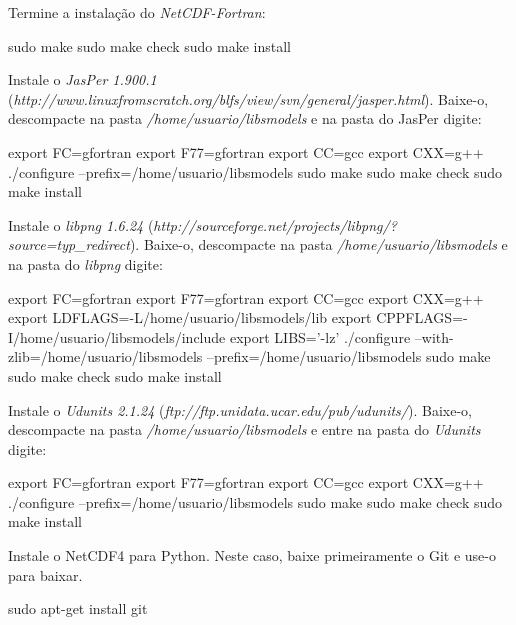 \noindent Termine a instalação do \textit{NetCDF-Fortran}:
\bigskip

\begin{bashcode}
sudo make
sudo make check
sudo make install
\end{bashcode}
\bigskip

\noindent Instale o \textit{JasPer 1.900.1} (\textcolor{bleu_cite}{\textit{http://www.linuxfromscratch.org/blfs/view/svn/general/jasper.html}}). Baixe-o, descompacte na pasta \textit{/home/usuario/libsmodels} e na pasta do JasPer digite:
\bigskip

\begin{bashcode}
export FC=gfortran
export F77=gfortran
export CC=gcc
export CXX=g++
./configure --prefix=/home/usuario/libsmodels
sudo make
sudo make check
sudo make install
\end{bashcode}
\bigskip

\noindent Instale o \textit{libpng 1.6.24} (\textcolor{bleu_cite}{\textit{http://sourceforge.net/projects/libpng/?source=typ\_redirect}}). Baixe-o, descompacte na pasta \textit{/home/usuario/libsmodels} e na pasta do \textit{libpng} digite:
\bigskip

\begin{bashcode}[fontsize=\scriptsize]
export FC=gfortran
export F77=gfortran
export CC=gcc
export CXX=g++
export LDFLAGS=-L/home/usuario/libsmodels/lib
export CPPFLAGS=-I/home/usuario/libsmodels/include
export LIBS='-lz'
./configure --with-zlib=/home/usuario/libsmodels --prefix=/home/usuario/libsmodels
sudo make
sudo make check
sudo make install
\end{bashcode}
\bigskip

\noindent Instale o \textit{Udunits 2.1.24} (\textcolor{bleu_cite}{\textit{ftp://ftp.unidata.ucar.edu/pub/udunits/}}).  Baixe-o, descompacte na pasta \textit{/home/usuario/libsmodels} e entre na pasta do \textit{Udunits} digite:
\bigskip

\begin{bashcode}
export FC=gfortran
export F77=gfortran
export CC=gcc
export CXX=g++
./configure --prefix=/home/usuario/libsmodels
sudo make
sudo make check
sudo make install
\end{bashcode}
\bigskip

\noindent Instale o NetCDF4 para Python. Neste caso, baixe primeiramente o Git e use-o para baixar.
\bigskip

\begin{bashcode}
sudo apt-get install git
\end{bashcode}
\bigskip

